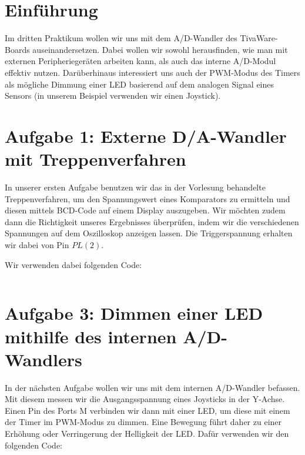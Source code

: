 \documentclass{article}
\begin{document}
\newpage


\tableofcontents

\listoffigures

\lstlistoflistings

\newpage

\section{Einführung}

Im dritten Praktikum wollen wir uns mit dem A/D-Wandler des TivaWare-Boards auseinandersetzen. Dabei wollen wir sowohl herausfinden, wie man mit externen Peripheriegeräten arbeiten kann, als auch das interne A/D-Modul effektiv nutzen. Darüberhinaus interessiert uns auch der PWM-Modus des Timers als mögliche Dimmung einer LED basierend auf dem analogen Signal eines Sensors (in unserem Beispiel verwenden wir einen Joystick).

\section{Aufgabe 1: Externe D/A-Wandler mit Treppenverfahren}

In unserer ersten Aufgabe benutzen wir das in der Vorlesung behandelte Treppenverfahren, um den Spannungswert eines Komparators zu ermitteln und diesen mittels BCD-Code auf einem Display auszugeben. Wir möchten zudem dann die Richtigkeit unseres Ergebnisses überprüfen, indem wir die verschiedenen Spannungen auf dem Oszilloskop anzeigen lassen. Die Triggerspannung erhalten wir dabei von Pin $PL(2)$.

Wir verwenden dabei folgenden Code:

\begin{lstlisting}[language=c, caption={stepfnc.c zur Approximation der Spannung $U_{E}$ mit dem Treppenverfahren}, captionpos=b]
\end{lstlisting}


\section{Aufgabe 3: Dimmen einer LED mithilfe des internen A/D-Wandlers}

In der nächsten Aufgabe wollen wir uns mit dem internen A/D-Wandler befassen. Mit diesem messen wir die Ausgangsspannung eines Joysticks in der Y-Achse. Einen Pin des Ports M verbinden wir dann mit einer LED, um diese mit einem der Timer im PWM-Modus zu dimmen. Eine Bewegung führt daher zu einer Erhöhung oder Verringerung der Helligkeit der LED. Dafür verwenden wir den folgenden Code:
\end{document}
